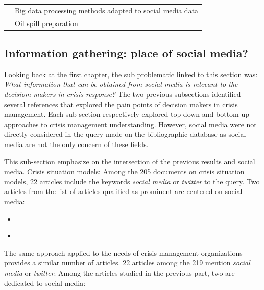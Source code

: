 \begin{table}[bp]
\begin{tabular}{m{} m{}}
        \cite{cobbDesigningDelugeUnderstanding2014}                 & Big data processing methods adapted to social media data                                                                                                                                                               \\
        \cite{cabreraaguileraModellingPerformanceVariabilities2016} & Oil spill preparation                                                                                                                                                                                                  \\
        \bottomrule
    \end{tabular}
    \label{table:business-needs-main-articles}
\end{table}

\subsection{Information gathering: place of social media?}
Looking back at the first chapter, the sub problematic linked to this section was: \emph{What information that can be obtained from social media is relevant to the decisiom makers in crisis response?}
The two previous subsections identified several references that explored the pain points of decision makers in crisis management.
Each sub-section respectively explored top-down and bottom-up approaches to crisis management understanding.
However, social media were not directly considered in the query made on the bibliographic database as social media are not the only concern of these fields.

This sub-section emphasize on the intersection of the previous results and social media.
Crisis situation models:
Among the 205 documents on crisis situation models, 22 articles include the keywords \emph{social media} or \emph{twitter} to the query.
Two articles from the list of articles qualified as prominent are centered on social media:

\begin{itemize}
    \item \textcite{purohitIdentifyingSeekersSuppliers2014}
    \item \textcite{ghahremanlouGeotaggingTwitterMessages2014}
\end{itemize}

The same approach applied to the needs of crisis management organizations provides a similar number of articles.
22 articles among the 219 mention \emph{social media} or \emph{twitter}.
Among the articles studied in the previous part, two are dedicated to social media:

